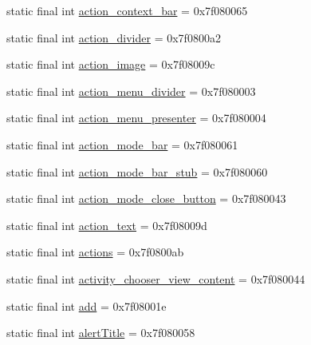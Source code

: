\begin{CompactItemize}
static final int \hyperlink{classandroid_1_1support_1_1graphics_1_1drawable_1_1_r_1_1id_80840d6df23ce9e9b97f4758454a9e46}{action\_\-context\_\-bar} = 0x7f080065
\item 
static final int \hyperlink{classandroid_1_1support_1_1graphics_1_1drawable_1_1_r_1_1id_6b5787d910b7f2bc5c32f782a6f3b8be}{action\_\-divider} = 0x7f0800a2
\item 
static final int \hyperlink{classandroid_1_1support_1_1graphics_1_1drawable_1_1_r_1_1id_383bdea623463ede7b9ba40c45c05297}{action\_\-image} = 0x7f08009c
\item 
static final int \hyperlink{classandroid_1_1support_1_1graphics_1_1drawable_1_1_r_1_1id_e9d83d9bfb481152ff2db8c7bd620519}{action\_\-menu\_\-divider} = 0x7f080003
\item 
static final int \hyperlink{classandroid_1_1support_1_1graphics_1_1drawable_1_1_r_1_1id_e5b0bde8ade2399e9b18d69dcb6cf23a}{action\_\-menu\_\-presenter} = 0x7f080004
\item 
static final int \hyperlink{classandroid_1_1support_1_1graphics_1_1drawable_1_1_r_1_1id_ea2817e3ddf3bda1cbd3a21528cf96b3}{action\_\-mode\_\-bar} = 0x7f080061
\item 
static final int \hyperlink{classandroid_1_1support_1_1graphics_1_1drawable_1_1_r_1_1id_5174234a47dea0a5cb540a310996fc9c}{action\_\-mode\_\-bar\_\-stub} = 0x7f080060
\item 
static final int \hyperlink{classandroid_1_1support_1_1graphics_1_1drawable_1_1_r_1_1id_3850dd0e886737ed8a05038338985118}{action\_\-mode\_\-close\_\-button} = 0x7f080043
\item 
static final int \hyperlink{classandroid_1_1support_1_1graphics_1_1drawable_1_1_r_1_1id_370b621deefdfd383a3417755acc1e0f}{action\_\-text} = 0x7f08009d
\item 
static final int \hyperlink{classandroid_1_1support_1_1graphics_1_1drawable_1_1_r_1_1id_7668bd5ec70bc6aee41c9b1b22356d9c}{actions} = 0x7f0800ab
\item 
static final int \hyperlink{classandroid_1_1support_1_1graphics_1_1drawable_1_1_r_1_1id_7edfe3ff129b72d3191c5ef8a74d8255}{activity\_\-chooser\_\-view\_\-content} = 0x7f080044
\item 
static final int \hyperlink{classandroid_1_1support_1_1graphics_1_1drawable_1_1_r_1_1id_8124590fd5a4335f7c1e8c2f92954e43}{add} = 0x7f08001e
\item 
static final int \hyperlink{classandroid_1_1support_1_1graphics_1_1drawable_1_1_r_1_1id_9364902c9303b4b5967b8d323fe1cb47}{alertTitle} = 0x7f080058

\end{CompactItemize}
